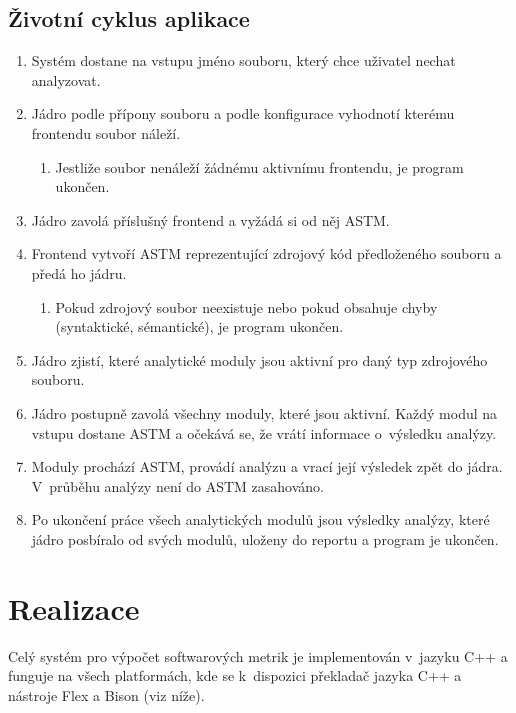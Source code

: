 \documentclass[11pt,twoside,a4paper]{book}
\begin{document}
\section{Životní cyklus aplikace}
\begin{enumerate}
 \item Systém dostane na vstupu jméno souboru, který chce uživatel nechat analyzovat.
 \item Jádro podle přípony souboru a podle konfigurace vyhodnotí kterému frontendu soubor náleží.
 \begin{enumerate}
  \item Jestliže soubor nenáleží žádnému aktivnímu frontendu, je program ukončen.
 \end{enumerate}
 \item Jádro zavolá příslušný frontend a vyžádá si od něj ASTM.
 \item Frontend vytvoří ASTM reprezentující zdrojový kód předloženého souboru a předá ho jádru.
 \begin{enumerate}
  \item Pokud zdrojový soubor neexistuje nebo pokud obsahuje chyby (syntaktické, sémantické), je program ukončen.
 \end{enumerate}
 \item Jádro zjistí, které analytické moduly jsou aktivní pro daný typ zdrojového souboru.
 \item Jádro postupně zavolá všechny moduly, které jsou aktivní. Každý modul na vstupu dostane ASTM a očekává se, že vrátí informace o~výsledku analýzy.
 \item Moduly prochází ASTM, provádí analýzu a vrací její výsledek zpět do jádra. V~průběhu analýzy není do ASTM zasahováno.
 \item Po ukončení práce všech analytických modulů jsou výsledky analýzy, které jádro posbíralo od svých modulů, uloženy do reportu a program je ukončen.
\end{enumerate}

\chapter{Realizace}
\label{sec:Realizace}
Celý systém pro výpočet softwarových metrik je implementován v~jazyku C++ a funguje na všech platformách, kde se
k~dispozici překladač jazyka C++ a nástroje Flex a Bison (viz níže).
\end{document}
